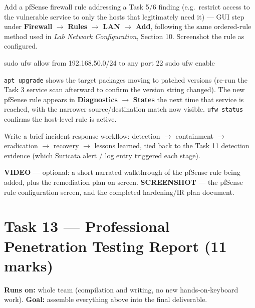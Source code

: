 \documentclass[11pt,a4paper]{article}
\begin{document}
\begin{steps}
\item Add a pfSense firewall rule addressing a Task 5/6 finding (e.g.\ restrict access
  to the vulnerable service to only the hosts that legitimately need it) --- GUI step
  under \textbf{Firewall} $\to$ \textbf{Rules} $\to$ \textbf{LAN} $\to$ \textbf{Add},
  following the same ordered-rule method used in \emph{Lab Network Configuration},
  Section 10. Screenshot the rule as configured.
\end{steps}

\begin{cmdbox}
\begin{cmdverb}
sudo ufw allow from 192.168.50.0/24 to any port 22
sudo ufw enable
\end{cmdverb}
\end{cmdbox}

\begin{expectbox}
\texttt{apt upgrade} shows the target packages moving to patched versions (re-run the
Task 3 service scan afterward to confirm the version string changed). The new pfSense
rule appears in \textbf{Diagnostics} $\to$ \textbf{States} the next time that service is
reached, with the narrower source/destination match now visible. \texttt{ufw status}
confirms the host-level rule is active.
\end{expectbox}

\begin{steps}
\item Write a brief incident response workflow: detection $\to$ containment $\to$
  eradication $\to$ recovery $\to$ lessons learned, tied back to the Task 11 detection
  evidence (which Suricata alert / log entry triggered each stage).
\end{steps}

\begin{notebox}
\textbf{VIDEO} --- optional: a short narrated walkthrough of the pfSense rule being
added, plus the remediation plan on screen. \textbf{SCREENSHOT} --- the pfSense rule
configuration screen, and the completed hardening/IR plan document.
\end{notebox}

\clearpage

\section{Task 13 --- Professional Penetration Testing Report (11 marks)}
\textbf{Runs on:} whole team (compilation and writing, no new hands-on-keyboard work).
\quad\textbf{Goal:} assemble everything above into the final deliverable.
\end{document}
